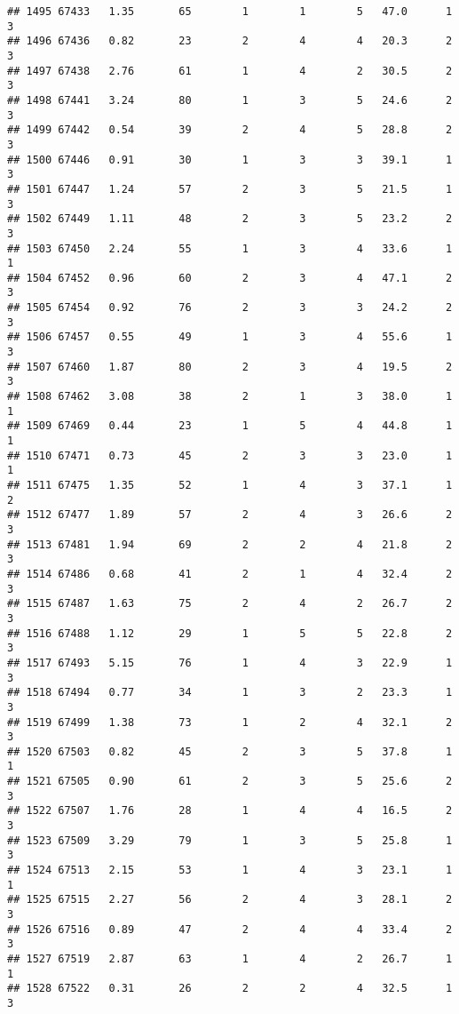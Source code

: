 \documentclass[
]{article}
\begin{document}
\begin{verbatim}
## 1495 67433   1.35       65        1        1        5   47.0      1      3
## 1496 67436   0.82       23        2        4        4   20.3      2      3
## 1497 67438   2.76       61        1        4        2   30.5      2      3
## 1498 67441   3.24       80        1        3        5   24.6      2      3
## 1499 67442   0.54       39        2        4        5   28.8      2      3
## 1500 67446   0.91       30        1        3        3   39.1      1      3
## 1501 67447   1.24       57        2        3        5   21.5      1      3
## 1502 67449   1.11       48        2        3        5   23.2      2      3
## 1503 67450   2.24       55        1        3        4   33.6      1      1
## 1504 67452   0.96       60        2        3        4   47.1      2      3
## 1505 67454   0.92       76        2        3        3   24.2      2      3
## 1506 67457   0.55       49        1        3        4   55.6      1      3
## 1507 67460   1.87       80        2        3        4   19.5      2      3
## 1508 67462   3.08       38        2        1        3   38.0      1      1
## 1509 67469   0.44       23        1        5        4   44.8      1      1
## 1510 67471   0.73       45        2        3        3   23.0      1      1
## 1511 67475   1.35       52        1        4        3   37.1      1      2
## 1512 67477   1.89       57        2        4        3   26.6      2      3
## 1513 67481   1.94       69        2        2        4   21.8      2      3
## 1514 67486   0.68       41        2        1        4   32.4      2      3
## 1515 67487   1.63       75        2        4        2   26.7      2      3
## 1516 67488   1.12       29        1        5        5   22.8      2      3
## 1517 67493   5.15       76        1        4        3   22.9      1      3
## 1518 67494   0.77       34        1        3        2   23.3      1      3
## 1519 67499   1.38       73        1        2        4   32.1      2      3
## 1520 67503   0.82       45        2        3        5   37.8      1      1
## 1521 67505   0.90       61        2        3        5   25.6      2      3
## 1522 67507   1.76       28        1        4        4   16.5      2      3
## 1523 67509   3.29       79        1        3        5   25.8      1      3
## 1524 67513   2.15       53        1        4        3   23.1      1      1
## 1525 67515   2.27       56        2        4        3   28.1      2      3
## 1526 67516   0.89       47        2        4        4   33.4      2      3
## 1527 67519   2.87       63        1        4        2   26.7      1      1
## 1528 67522   0.31       26        2        2        4   32.5      1      3

\end{verbatim}
\end{document}
